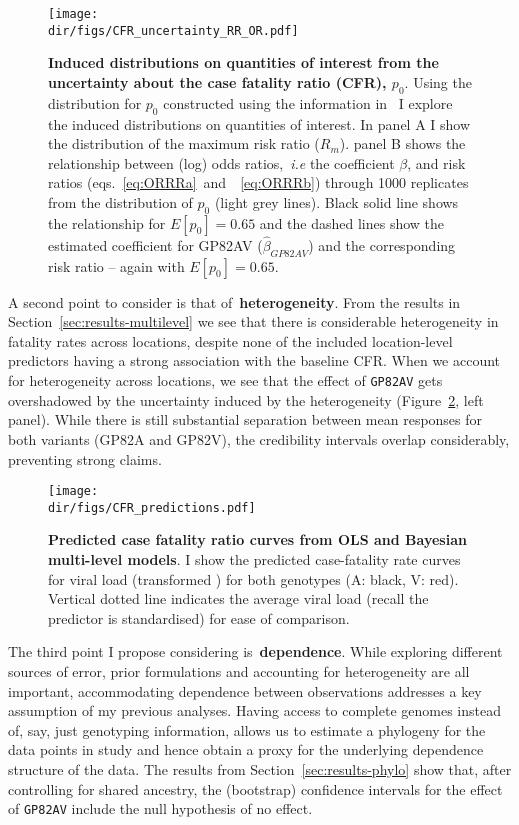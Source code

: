 \begin{figure}[!ht]
  \centering
  \texttt{[image: \\dir/figs/CFR\_uncertainty\_RR\_OR.pdf]}
\caption[Induced distributions on quantities of interest from the uncertainty about the case fatality ratio.]{\textbf{Induced distributions on quantities of interest from the uncertainty about the case fatality ratio (CFR), $p_0$}.
Using the distribution for $p_0$ constructed using the information in~\cite{Nyakarahuka2016} I explore the induced distributions on quantities of interest.  
In panel A I show the distribution of the maximum risk ratio ($R_m$).
panel B shows the relationship between (log) odds ratios,~\textit{i.e} the coefficient $\beta$, and risk ratios (eqs.~\ref{eq:ORRRa}~and~~\ref{eq:ORRRb}) through 1000 replicates from the distribution of $p_0$ (light grey lines).
Black solid line shows the relationship for $E[p_0] = 0.65$ and the dashed lines show the estimated coefficient for GP82AV ($\hat{\beta}_{GP82AV}$) and the corresponding risk ratio -- again with $E[p_0] = 0.65$.
}
\label{fig:ORRRuncertainty}
\end{figure}

A second point to consider is that of~\textbf{heterogeneity}.
From the results in Section~\ref{sec:results-multilevel} we see that there is considerable heterogeneity in fatality rates across locations, despite none of the included location-level predictors having a strong association with the baseline CFR.
When we account for heterogeneity across locations, we see that the effect of \verb|GP82AV| gets overshadowed by the uncertainty induced by the heterogeneity (Figure~\ref{fig:CFRpred}, left panel).
While there is still substantial separation between mean responses for both variants (GP82A and GP82V), the credibility intervals overlap considerably, preventing strong claims.

\begin{figure}[!ht]
  \centering
  \texttt{[image: \\dir/figs/CFR\_predictions.pdf]}
\caption[Predicted case fatality ratio curves from OLS and Bayesian multi-level models.]{\textbf{Predicted case fatality ratio curves from OLS and Bayesian multi-level models}.
I show the predicted case-fatality rate curves for viral load (transformed \ct) for both genotypes (A: black, V: red). 
Vertical dotted line indicates the average viral load (recall the predictor is standardised) for ease of comparison.
}
\label{fig:CFRpred}
\end{figure}

The third point I propose considering is~\textbf{dependence}.
While exploring different sources of error, prior formulations and accounting for heterogeneity are all important, accommodating dependence between observations addresses a key assumption of my previous analyses.
Having access to complete genomes instead of, say, just genotyping information, allows us to estimate a phylogeny for the data points in study and hence obtain a proxy for the underlying dependence structure of the data.
The results from Section~\ref{sec:results-phylo} show that, after controlling for shared ancestry, the (bootstrap) confidence intervals for the effect of \verb|GP82AV| include the null hypothesis of no effect.

